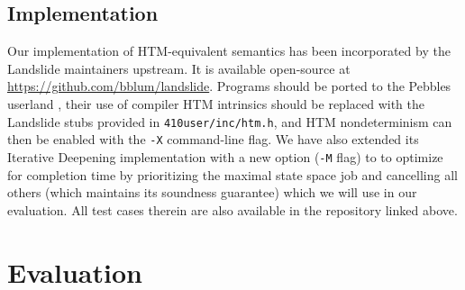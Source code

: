 \documentclass[10pt]{sigplanconf}
\begin{document}
\subsection{Implementation}

Our implementation of HTM-equivalent semantics has been incorporated by the Landslide maintainers upstream.
It is available open-source at \url{https://github.com/bblum/landslide}.
Programs should be ported to the Pebbles userland \cite{thrlib,kspec},
their use of compiler HTM intrinsics should be replaced with the Landslide stubs provided in {\tt 410user/inc/htm.h},
and HTM nondeterminism can then be enabled with the {\tt -X} command-line flag.
We have also extended its Iterative Deepening implementation \cite{quicksand}
with a new option ({\tt -M} flag) to
to optimize for completion time by prioritizing the maximal state space job and cancelling all others
(which maintains its soundness guarantee)
which we will use in our evaluation.
All test cases therein are also available in the repository linked above.


\section{Evaluation}

\newcommand\ETA[1]{\hilight{brownish}{{\em #1}}\xspace}
\newcommand\cpu[1]{\hilight{darkcyan}{{#1}}\xspace}
\newcommand\wtm[1]{\hilight{lime}{{#1}}\xspace}
\newcommand\ints[1]{\hilight{pinkish}{{#1}}\xspace}
\end{document}
